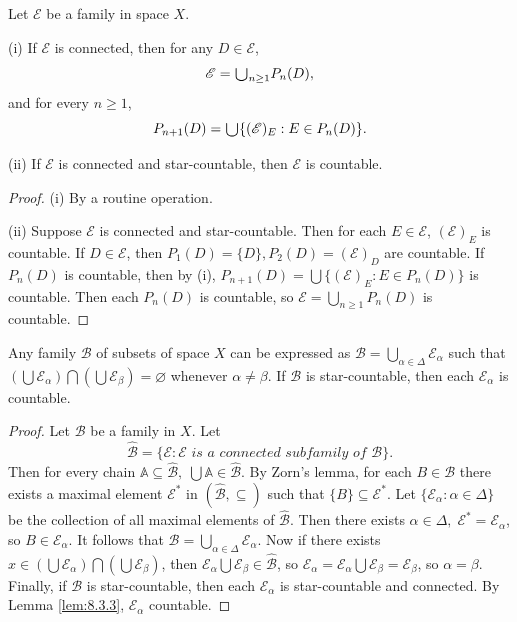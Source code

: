 \documentclass[jiang8iv.tex]{subfiles}
\begin{document}
{\lemma{\label{lem:8.3.3}} 
Let $\mathscr{E}$ be a family in space $X$.

\textup{(i)} 	If $\mathscr{E}$ is connected, then for any $D\in\mathscr{E}$,
$$\mathscr{E}=\raisebox{-2pt}{\scalebox{1.5}{$\cup$}}_{n\geq1}P_n(D),$$
	and for every $n\geq1$,
$$P_{n+1}(D)=\raisebox{-2pt}{\scalebox{1.5}{$\cup$}}\{(\mathscr{E})_E: E\in P_n(D)\}.$$
	
\textup{(ii)} 
	If $\mathscr{E}$ is connected and star-countable, then
	$\mathscr{E}$ is countable.
}

\begin{proof}
(i) By a routine operation.

(ii) Suppose $\mathscr{E}$ is connected and star-countable. Then for
each $E\in\mathscr{E}$, $(\mathscr{E})_E$ is countable.
If $D\in\mathscr{E}$, then
$P_1(D)=\{D\}, P_2(D)=(\mathscr{E})_{D}$
are countable. If $P_n(D)$ is countable, then by (i),
$P_{n+1}(D)=\bigcup\{(\mathscr{E})_E: E\in P_n(D)\}$
is countable. Then each
$P_n(D)$ is countable, so $\mathscr{E} = \bigcup_{n\ge 1}P_n(D)$
is countable.
\end{proof} 


{\lemma{\label{lem:8.3.4}} 
Any family $\mathscr{B}$ of subsets of space $X$ can be expressed as
$\mathscr{B}=\bigcup_{\alpha\in \Delta}\mathscr{E}_{\alpha}$
such that $\left(\bigcup\mathscr{E}_{\alpha}\right)\bigcap
\left(\bigcup\mathscr{E}_{\beta}\right)
=\varnothing$ whenever $\alpha\ne\beta$.
If $\mathscr{B}$ is star-countable, then each
$\mathscr{E}_{\alpha}$ is countable.
}

\begin{proof}
Let $\mathscr{B}$ be a family in $X$. Let
$$\hat{\mathscr{B}}=\{\mathscr{E}:\mathscr{E} \textit{ is a connected subfamily of } \mathscr{B}\}.$$
Then for every chain 
$\mathbb{A}\subseteq\hat{\mathscr{B}}, \; \bigcup \mathbb{A}\in \hat{\mathscr{B}}$. By Zorn's lemma,
for each $B\in \mathscr{B}$ there exists a maximal element 
$\mathscr{E}^*$ in $(\hat{\mathscr{B}}, \subseteq)$
such that $\{B\}\subseteq\mathscr{E}^*$. 
Let $\{\mathscr{E}_\alpha:\alpha\in\Delta\}$ be the collection of all
maximal elements of $\hat{\mathscr{B}}$. Then there exists $\alpha \in \Delta, \; 
 \mathscr{E}^* = \mathscr{E}_\alpha$, so
 $B\in\mathscr{E}_\alpha$.
It follows that $\mathscr{B}=\bigcup_{\alpha\in\Delta}\mathscr{E}_\alpha$. 
Now if there exists 
$x\in(\bigcup\mathscr{E}_\alpha)\bigcap(\bigcup\mathscr{E}_\beta)$, 
then $\mathscr{E}_\alpha\bigcup\mathscr{E}_\beta\in \hat{\mathscr{B}}$, so $\mathscr{E}_\alpha=\mathscr{E}_\alpha\bigcup\mathscr{E}_\beta
=\mathscr{E}_\beta$, so $\alpha=\beta$.
Finally, if $\mathscr{B}$ is star-countable, then each $\mathscr{E}_\alpha$ 
is star-countable and connected. By Lemma \ref{lem:8.3.3},
$\mathscr{E}_\alpha$  countable.
\end{proof}
\end{document}
